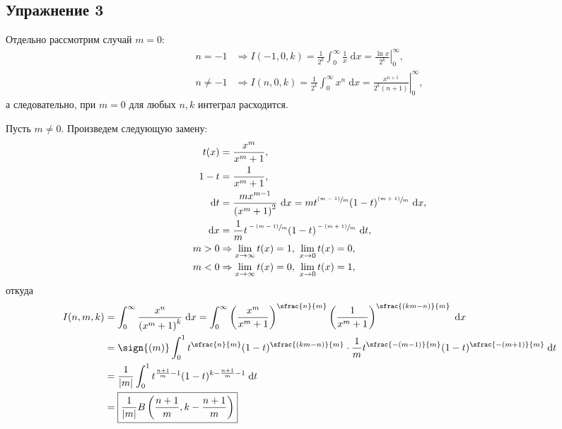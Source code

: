 \def \picdir{pic/}

\subsection*{Упражнение 3}
Отдельно рассмотрим случай $m = 0$:
\begin{align*}
  n = -1 &\Rightarrow I(-1,0,k) = \frac{1}{2^k}\int_{0}^{\infty} \frac{1}{x}\; \mathrm{d} x = \left. \frac{\ln{x}}{2^k} \right|_{0}^{\infty},\\
  n \ne -1 &\Rightarrow I(n,0,k) = \frac{1}{2^k}\int_{0}^{\infty} x^n\; \mathrm{d} x = \left. \frac{x^{n+1}}{2^k(n+1)} \right|_{0}^{\infty},
\end{align*}
а следовательно, при $m = 0$ для любых $n, k$ интеграл расходится.

Пусть $m \ne 0$. Произведем следующую замену:
\begin{align*}
  t(x) &= \frac{x^m}{x^m+1},\\
  1-t &= \frac{1}{x^m+1},\\
  \mathrm{d} t &= \frac{mx^{m-1}}{ \left(x^m+1\right)^2}\ \mathrm{d} x = mt^{\sfrac{(m-1)}{m}}(1-t)^{\sfrac{(m+1)}{m}}\ \mathrm{d} x,\\
  \mathrm{d} x &= \frac{1}{m}t^{\sfrac{-(m-1)}{m}}(1-t)^{\sfrac{-(m+1)}{m}}\ \mathrm{d} t,\\
  m > 0 &\Rightarrow \lim_{x \rightarrow \infty} t(x) = 1,\ \lim_{x \rightarrow 0} t(x) = 0,\\
  m < 0 &\Rightarrow \lim_{x \rightarrow \infty} t(x) = 0,\ \lim_{x \rightarrow 0} t(x) = 1,\\
\end{align*}
откуда
\begin{align*}
  I(n,m,k) &= \int_{0}^{\infty} \frac{x^n}{\left(x^m + 1\right)^k}\; \mathrm{d} x = \int_{0}^{\infty} \left(\frac{x^m}{x^m+1} \right)^{\sfrac{n}{m}} \left(\frac{1}{x^m+1} \right)^{\sfrac{(km-n)}{m}}  \; \mathrm{d} x\\
           &= \sign{(m)}\int_{0}^{1} t^{\sfrac{n}{m}}(1-t)^{\sfrac{(km-n)}{m}} \cdot \frac{1}{m}t^{\sfrac{-(m-1)}{m}}(1-t)^{\sfrac{-(m+1)}{m}}\; \mathrm{d} t\\
           &= \frac{1}{|m|}\int_{0}^{1} t^{\frac{n + 1}{m}-1}(1-t)^{k - \frac{n + 1}{m} - 1}\; \mathrm{d} t\\
           &= \boxed{\frac{1}{|m|} B \left(\frac{n+1}{m}, k-\frac{n+1}{m} \right)}
\end{align*}

